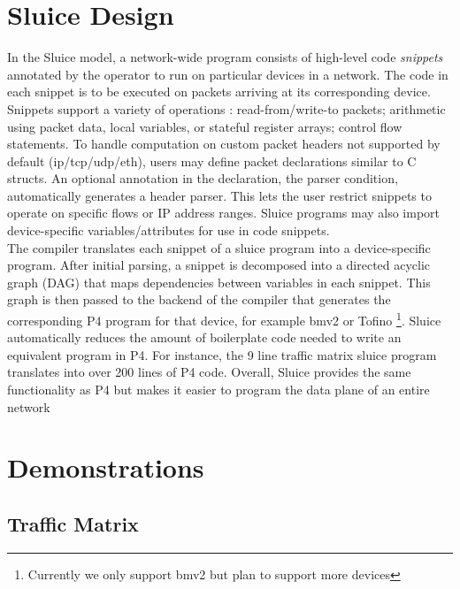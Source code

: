 
\section{Sluice Design}
In the Sluice model, a network-wide program consists of high-level code \textit{snippets} annotated by the operator to run on particular devices in a network. The code in each snippet is to be executed on packets arriving at its corresponding device. Snippets support a variety of operations : read-from/write-to packets; arithmetic using packet data, local variables, or stateful register arrays; control flow statements. To handle computation on custom packet headers not supported by default (ip/tcp/udp/eth), users may define packet declarations similar to C structs. An optional annotation in the declaration, the parser condition, automatically generates a header parser. This lets the user restrict snippets to operate on specific flows or IP address ranges. Sluice programs may also import device-specific variables/attributes for use in code snippets. \\
\indent The compiler translates each snippet of a sluice program into a device-specific program. After initial parsing, a snippet is decomposed into a directed acyclic graph (DAG) that maps dependencies between variables in each snippet. This graph is then passed to the backend of the compiler that generates the corresponding P4 program for that device, for example bmv2 or Tofino \footnote{Currently we only support bmv2 but plan to support more devices}. Sluice automatically reduces the amount of boilerplate code needed to write an equivalent program in P4. For instance, the 9 line traffic matrix sluice program translates into over 200 lines of P4 code. Overall, Sluice provides the same functionality as P4 but makes it easier to program the data plane of an entire network


 


\section{Demonstrations}
 
\subsection{Traffic Matrix}

